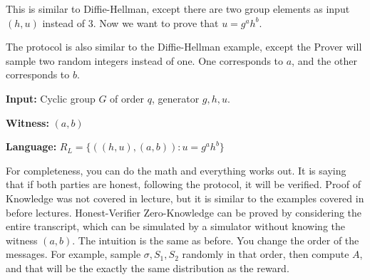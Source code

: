 \begin{example}

This is similar to Diffie-Hellman, except there are two group elements as input $(h, u)$ instead of 3. Now we want to prove that $u = g^a h^b$.

The protocol is also similar to the Diffie-Hellman example, except the Prover will sample two random integers instead of one. One corresponds to $a$, and the other corresponds to $b$.

\textbf{Input:} Cyclic group $G$ of order $q$, generator $g, h, u$.

\textbf{Witness:} $(a, b)$

\textbf{Language:} $R_{L} = \{ ((h, u), (a, b)): u = g^a h^b\}$


For completeness, you can do the math and everything works out. It is saying that if both parties are honest, following the protocol, it will be verified. Proof of Knowledge was not covered in lecture, but it is similar to the examples covered in before lectures. Honest-Verifier Zero-Knowledge can be proved by considering the entire transcript, which can be simulated by a simulator without knowing the witness $(a, b)$. The intuition is the same as before. You change the order of the messages. For example, sample $\sigma, S_1, S_2$ randomly in that order, then compute $A$, and that will be the exactly the same distribution as the reward.

\end{example}


